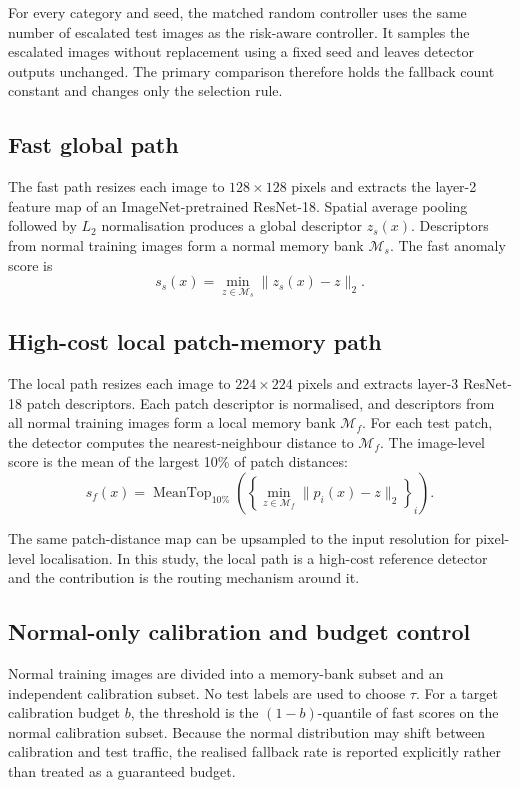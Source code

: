 \documentclass[preprint,12pt]{elsarticle}
\begin{document}
For every category and seed, the matched random controller uses the same number of escalated test images as the risk-aware controller. It samples the escalated images without replacement using a fixed seed and leaves detector outputs unchanged. The primary comparison therefore holds the fallback count constant and changes only the selection rule.

\subsection{Fast global path}

The fast path resizes each image to $128\times128$ pixels and extracts the layer-2 feature map of an ImageNet-pretrained ResNet-18. Spatial average pooling followed by $L_2$ normalisation produces a global descriptor $z_s(x)$. Descriptors from normal training images form a normal memory bank $\mathcal{M}_s$. The fast anomaly score is
\begin{equation}
s_s(x)=\min_{z\in\mathcal{M}_s}\|z_s(x)-z\|_2.
\end{equation}

\subsection{High-cost local patch-memory path}

The local path resizes each image to $224\times224$ pixels and extracts layer-3 ResNet-18 patch descriptors. Each patch descriptor is normalised, and descriptors from all normal training images form a local memory bank $\mathcal{M}_f$. For each test patch, the detector computes the nearest-neighbour distance to $\mathcal{M}_f$. The image-level score is the mean of the largest 10\% of patch distances:
\begin{equation}
s_f(x)=\operatorname{MeanTop}_{10\%}\left(\left\{\min_{z\in\mathcal{M}_f}\|p_i(x)-z\|_2\right\}_i\right).
\end{equation}

The same patch-distance map can be upsampled to the input resolution for pixel-level localisation. In this study, the local path is a high-cost reference detector and the contribution is the routing mechanism around it.

\subsection{Normal-only calibration and budget control}

Normal training images are divided into a memory-bank subset and an independent calibration subset. No test labels are used to choose $\tau$. For a target calibration budget $b$, the threshold is the $(1-b)$-quantile of fast scores on the normal calibration subset. Because the normal distribution may shift between calibration and test traffic, the realised fallback rate is reported explicitly rather than treated as a guaranteed budget.
\end{document}
